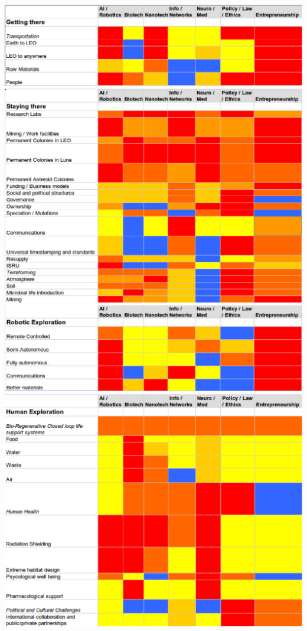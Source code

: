 \documentclass[letter,11pt]{article}
\begin{document}
\includegraphics[width=\textwidth]{hm_gt}
\includegraphics[width=\textwidth]{hm_st}
\includegraphics[width=\textwidth]{hm_re}
\includegraphics[width=\textwidth]{hm_he}
\end{document}
